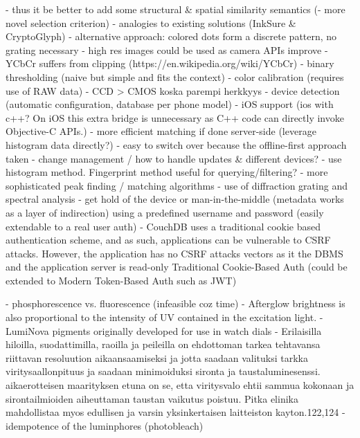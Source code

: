\documentclass[thesis.tex]{subfiles}
\begin{document}
- thus it be better to add some structural \& spatial similarity semantics (- more novel selection criterion) - analogies to existing solutions (InkSure \& CryptoGlyph)
  - alternative approach: colored dots form a discrete pattern, no grating necessary
- high res images could be used as camera APIs improve
- YCbCr suffers from clipping (https://en.wikipedia.org/wiki/YCbCr)
- binary thresholding (naive but simple and fits the context)
- color calibration (requires use of RAW data)
  - CCD > CMOS koska parempi herkkyys
- device detection (automatic configuration, database per phone model)
- iOS support (ios with c++? On iOS this extra bridge is unnecessary as C++ code can directly invoke Objective-C APIs.)
- more efficient matching if done server-side (leverage histogram data directly?)
  - easy to switch over because the offline-first approach taken
- change management / how to handle updates \& different devices?
- use histogram method. Fingerprint method useful for querying/filtering?
- more sophisticated peak finding / matching algorithms
- use of diffraction grating and spectral analysis
- get hold of the device or man-in-the-middle (metadata works as a layer of indirection)
using a predefined username and password (easily extendable to a real user auth)
- CouchDB uses a traditional cookie based authentication scheme, and as such, applications can be vulnerable to CSRF attacks. However, the application has no CSRF attacks vectors as it the DBMS and the application server is read-only
Traditional Cookie-Based Auth (could be extended to Modern Token-Based Auth such as JWT)

- phosphorescence vs. fluorescence (infeasible coz time)
- Afterglow brightness is also proportional to the intensity of UV contained in the excitation light.
- LumiNova pigments originally developed for use in watch dials
- Erilaisilla hiloilla, suodattimilla, raoilla ja peileilla on ehdottoman tarkea tehtavansa riittavan resoluution aikaansaamiseksi ja jotta saadaan valituksi tarkka viritysaallonpituus ja saadaan minimoiduksi sironta ja taustaluminesenssi. aikaerotteisen maarityksen etuna on se, etta viritysvalo ehtii sammua kokonaan ja sirontailmioiden aiheuttaman taustan vaikutus poistuu. Pitka elinika mahdollistaa myos edullisen ja varsin yksinkertaisen laitteiston kayton.122,124
- idempotence of the luminphores (photobleach)
\end{document}
